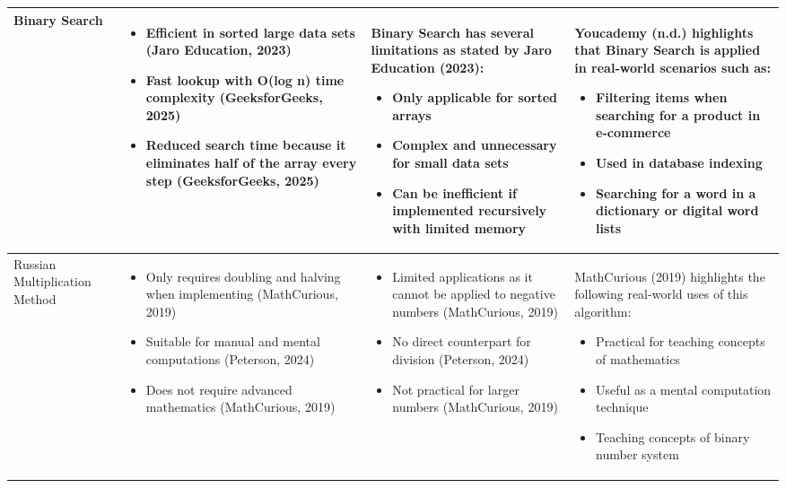 \documentclass{article}
\begin{document}
\begin{longtable}{|p{2.5cm}|p{4.3cm}|p{4.3cm}|p{}|}
Binary Search &
\begin{itemize}
\itemindent=-13pt
\item Efficient in sorted large data sets (Jaro Education, 2023)
\item Fast lookup with O(log n) time complexity (GeeksforGeeks, 2025)
\item Reduced search time because it eliminates half of the array every step (GeeksforGeeks, 2025)
\end{itemize}
&
Binary Search has several limitations as stated by Jaro Education (2023):
\begin{itemize}
\itemindent=-13pt
\item Only applicable for sorted arrays
\item Complex and unnecessary for small data sets
\item Can be inefficient if implemented recursively with limited memory 
\end{itemize}
&
Youcademy (n.d.) highlights that Binary Search is applied in real-world scenarios such as:
\begin{itemize}
\itemindent=-13pt
\item Filtering items when searching for a product in e-commerce 
\item Used in database indexing
\item Searching for a word in a dictionary or digital word lists
\end{itemize}
\\
\hline

Russian Multiplication Method &
\begin{itemize}
\itemindent=-13pt
\item Only requires doubling and halving when implementing (MathCurious, 2019)
\item Suitable for manual and mental computations (Peterson, 2024)
\item Does not require advanced mathematics (MathCurious, 2019)
\end{itemize}
&

\begin{itemize}
\itemindent=-13pt
\item Limited applications as it cannot be applied to negative numbers (MathCurious, 2019)
\item No direct counterpart for division (Peterson, 2024)
\item Not practical for larger numbers (MathCurious, 2019)
\end{itemize}
&
MathCurious (2019) highlights the following real-world uses of this algorithm:
\begin{itemize}
\itemindent=-13pt
\item Practical for teaching concepts of mathematics
\item Useful as a mental computation technique
\item Teaching concepts of binary number system
\end{itemize}
\\
\hline


\end{longtable}
\end{document}
